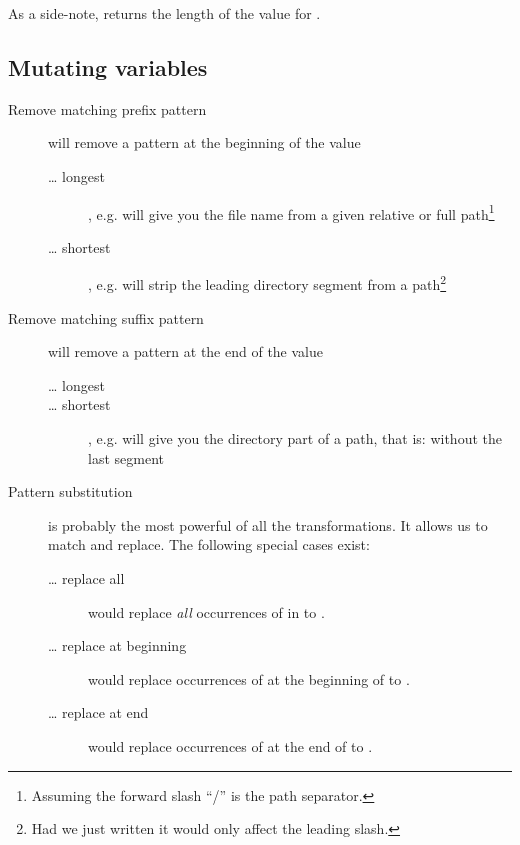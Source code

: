 \documentclass{olli-handout}
\begin{document}
As a side-note,  returns the length of the value for .

\subsection{Mutating variables}

\begin{description}
    \item[Remove matching prefix pattern] will remove a pattern at the beginning of the value
    \begin{description}
        \item[\ldots{} longest] , e.g.  will give you the file name from a given relative or full path\footnote{Assuming the forward slash ``/'' is the path separator.}
        \item[\ldots{} shortest] , e.g.  will strip the leading directory segment from a path\footnote{Had we just written  it would only affect the leading slash.}
    \end{description}
    \item[Remove matching suffix pattern] will remove a pattern at the end of the value
    \begin{description}
        \item[\ldots{} longest] 
        \item[\ldots{} shortest] , e.g.  will give you the directory part of a path, that is: without the last segment
    \end{description}
    \item[Pattern substitution]  is probably the most powerful of all the transformations. It allows us to match and replace. The following special cases exist:
    \begin{description}
        \item[\ldots{} replace all]  would replace \emph{all} occurrences of  in  to .
        \item[\ldots{} replace at beginning]  would replace occurrences of  at the beginning of  to .
        \item[\ldots{} replace at end]  would replace occurrences of  at the end of  to .

\end{description}
\end{description}
\end{document}
